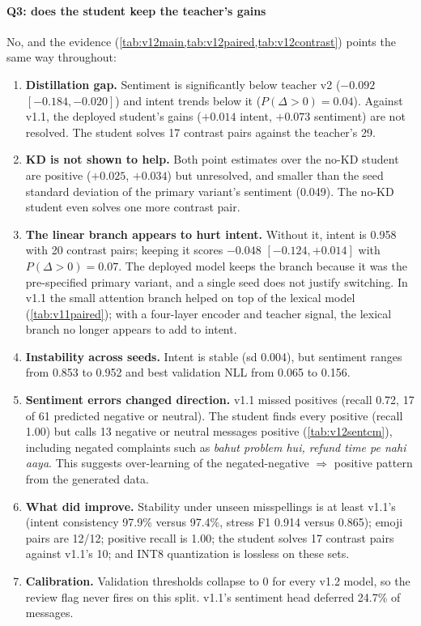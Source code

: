\documentclass[11pt,a4paper]{article}
\theoremstyle{remark}
\newcommand{\hi}[1]{\textit{#1}}                       %
\begin{document}
\paragraph{Q3: does the student keep the teacher's gains} No, and the evidence (\cref{tab:v12main,tab:v12paired,tab:v12contrast}) points the same way throughout:
\begin{enumerate}
  \item \textbf{Distillation gap.} Sentiment is significantly below teacher v2 ($-0.092$ $[-0.184, -0.020]$) and intent trends below it ($P(\Delta>0)=0.04$). Against v1.1, the deployed student's gains ($+0.014$ intent, $+0.073$ sentiment) are not resolved. The student solves 17 contrast pairs against the teacher's 29.
  \item \textbf{KD is not shown to help.} Both point estimates over the no-KD student are positive ($+0.025$, $+0.034$) but unresolved, and smaller than the seed standard deviation of the primary variant's sentiment (0.049). The no-KD student even solves one more contrast pair.
  \item \textbf{The linear branch appears to hurt intent.} Without it, intent is 0.958 with 20 contrast pairs; keeping it scores $-0.048$ $[-0.124, +0.014]$ with $P(\Delta>0)=0.07$. The deployed model keeps the branch because it was the pre-specified primary variant, and a single seed does not justify switching. In v1.1 the small attention branch helped on top of the lexical model (\cref{tab:v11paired}); with a four-layer encoder and teacher signal, the lexical branch no longer appears to add to intent.
  \item \textbf{Instability across seeds.} Intent is stable (sd 0.004), but sentiment ranges from 0.853 to 0.952 and best validation NLL from 0.065 to 0.156.
  \item \textbf{Sentiment errors changed direction.} v1.1 missed positives (recall 0.72, 17 of 61 predicted negative or neutral). The student finds every positive (recall 1.00) but calls 13 negative or neutral messages positive (\cref{tab:v12sentcm}), including negated complaints such as \hi{bahut problem hui, refund time pe nahi aaya}. This suggests over-learning of the negated-negative $\Rightarrow$ positive pattern from the generated data.
  \item \textbf{What did improve.} Stability under unseen misspellings is at least v1.1's (intent consistency 97.9\% versus 97.4\%, stress F1 0.914 versus 0.865); emoji pairs are 12/12; positive recall is 1.00; the student solves 17 contrast pairs against v1.1's 10; and INT8 quantization is lossless on these sets.
  \item \textbf{Calibration.} Validation thresholds collapse to 0 for every v1.2 model, so the review flag never fires on this split. v1.1's sentiment head deferred 24.7\% of messages.
\end{enumerate}
\end{document}
